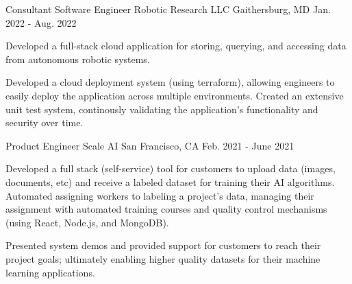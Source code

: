 
\begin{cventries}
  \cventry
    {Consultant Software Engineer} %
    {Robotic Research LLC} %
    {Gaithersburg, MD} %
    {Jan. 2022 - Aug. 2022} %
    {
      \begin{cvitems} %
        \item {Developed a full-stack cloud application for storing, querying, and accessing data from autonomous robotic systems.}
        \item {Developed a cloud deployment system (using terraform), allowing engineers to easily deploy the application across multiple environments.
          Created an extensive unit test system, continously validating the application's functionality and security over time.
        }
      \end{cvitems}
    }


  \cventry
    {Product Engineer} %
    {Scale AI} %
    {San Francisco, CA} %
    {Feb. 2021 - June 2021} %
    {
      \begin{cvitems} %
        \item {Developed a full stack (self-service) tool for customers to upload data (images, documents, etc) and receive a labeled dataset for training their AI algorithms.  Automated assigning workers to labeling a project's data, managing their assignment with automated training courses and quality control mechanisms (using React, Node.js, and MongoDB).}
        \item {Presented system demos and provided support for customers to reach their project goals; ultimately enabling higher quality datasets for their machine learning applications.}
      \end{cvitems}
    }


\end{cventries}

